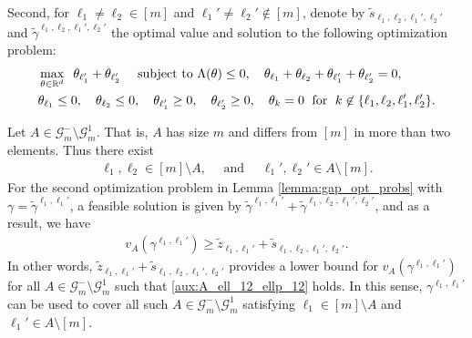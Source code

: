 \documentclass[aap,preprint]{imsart}
\newcommand{\Mstar}{[m]}
\newcommand{\bR}{{\mathbb{R}}}
\theoremstyle{plain}
\theoremstyle{definition}
\begin{document}
Second, for $\ell_1 \neq \ell_2 \in \Mstar$ and $\ell_1' \neq \ell_2' \not \in \Mstar$, denote by $\tilde{s}_{\ell_1,\ell_2,\ell_1',\ell_2'}$ and $\tilde{\gamma}^{\ell_1,\ell_2,\ell_1',\ell_2'}$ the optimal value and solution to the following optimization problem:
\begin{align}\label{gap:4index_opt}
\begin{split}
    & \max_{\theta \in \bR^d} \;\;  \theta_{\ell_1'} + \theta_{\ell_2'} \quad \textup{ subject to }   \Lambda(\theta) \leq 0, \quad \theta_{\ell_1} + \theta_{\ell_2} + \theta_{\ell'_1} +\theta_{\ell'_2}  = 0, \\
 &\theta_{\ell_1} \leq 0, \quad \theta_{\ell_2} \leq 0, \quad \theta_{\ell_1'} \geq 0,\quad \theta_{\ell_2'} \geq 0, \quad  \theta_k = 0\; \text{ for } \;k \not\in \{\ell_1,\ell_2,\ell_1',\ell_2'\}.
 \end{split}
\end{align}

Let $A \in \mathcal{G}_m^{-} \setminus\mathcal{G}_m^{1}$. That is, $A$ has size $m$ and differs from $\Mstar$ in more than two elements. Thus there exist
\begin{align}\label{aux:A_ell_12_ellp_12}
    \ell_1,\ell_2 \in \Mstar \setminus A, \quad \text{ and } \quad
\ell_1',\ell_2' \in A\setminus \Mstar.
\end{align}
For the second optimization problem in Lemma \ref{lemma:gap_opt_probs} with $\gamma = \tilde{\gamma}^{\ell_1,\ell_1'}$, a feasible solution is given by $\tilde{\gamma}^{\ell_1,\ell_1'} + \tilde{\gamma}^{\ell_1,\ell_2, \ell_1',\ell_2'}$, and as a result, we have
\begin{align}
    \label{aux:gap_lower_bound_12}
    v_A(\gamma^{\ell_1,\ell_1'}) \geq \tilde{z}_{\ell_1,\ell_1'} + \tilde{s}_{\ell_1,\ell_2,\ell_1',\ell_2'}.
\end{align}
In other words, $\tilde{z}_{\ell_1,\ell_1'} + \tilde{s}_{\ell_1,\ell_2,\ell_1',\ell_2'}$ provides a lower bound for $v_A(\gamma^{\ell_1,\ell_1'})$ for all $A \in \mathcal{G}_m^{-} \setminus \mathcal{G}_m^{1}$ such that \eqref{aux:A_ell_12_ellp_12} holds. In this sense, $\gamma^{\ell_1,\ell_1'}$ can be used to cover all such $A \in \mathcal{G}_m^{-} \setminus \mathcal{G}_m^{1}$ satisfying $\ell_1 \in \Mstar \setminus A$ and $\ell_1' \in A \setminus \Mstar$.
\end{document}
